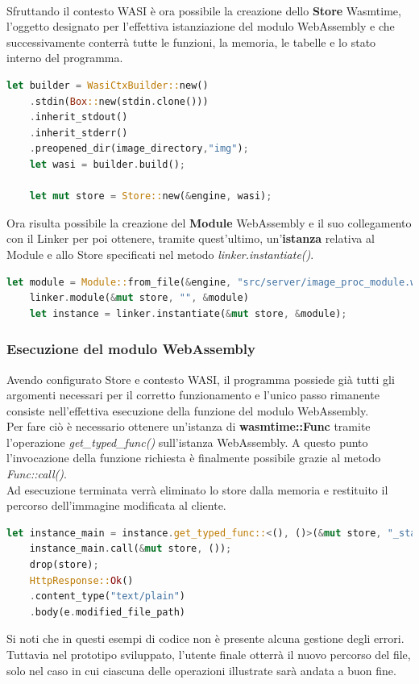 \\Sfruttando il contesto WASI è ora possibile la creazione dello \textbf{Store} Wasmtime, l'oggetto designato per l'effettiva istanziazione del modulo WebAssembly e che successivamente conterrà tutte le funzioni, la memoria, le tabelle e lo stato interno del programma.
\begin{lstlisting}[language=rust,caption={File handlers.rs: creazione di contesto WASI e Store}, showstringspaces=false]
    let builder = WasiCtxBuilder::new()
    .stdin(Box::new(stdin.clone()))
    .inherit_stdout()
    .inherit_stderr()
    .preopened_dir(image_directory,"img");
    let wasi = builder.build();
    
    let mut store = Store::new(&engine, wasi);
\end{lstlisting}
Ora risulta possibile la creazione del \textbf{Module} WebAssembly e il suo collegamento con il Linker per poi ottenere, tramite quest'ultimo, un'\textbf{istanza} relativa al Module e allo Store specificati nel metodo \emph{linker.instantiate()}.

\begin{lstlisting}[language=rust,caption={File handlers.rs: istanziazione modulo Wasm}, showstringspaces=false]
    let module = Module::from_file(&engine, "src/server/image_proc_module.wasm");
    linker.module(&mut store, "", &module) 
    let instance = linker.instantiate(&mut store, &module);
\end{lstlisting}
\subsubsection{Esecuzione del modulo WebAssembly}
Avendo configurato Store e contesto WASI, il programma possiede già tutti gli argomenti necessari per il corretto funzionamento e l'unico passo rimanente consiste nell'effettiva esecuzione della funzione del modulo WebAssembly.
\\Per fare ciò è  necessario ottenere un'istanza di \textbf{wasmtime::Func} tramite l'operazione \emph{get\_typed\_func()} sull'istanza WebAssembly.
A questo punto l'invocazione della funzione richiesta è finalmente possibile grazie al metodo \emph{Func::call()}.
\\Ad esecuzione terminata verrà eliminato lo store dalla memoria e restituito il percorso dell'immagine modificata al cliente.
\begin{lstlisting}[language=rust,caption={File handlers.rs: invocazione funzione \_start presente nel modulo Wasm}, showstringspaces=false]
    let instance_main = instance.get_typed_func::<(), ()>(&mut store, "_start");
    instance_main.call(&mut store, ());
    drop(store);
    HttpResponse::Ok()
    .content_type("text/plain")
    .body(e.modified_file_path)
\end{lstlisting}
Si noti che in questi esempi di codice non è presente alcuna gestione degli errori. Tuttavia nel prototipo sviluppato, l'utente finale otterrà il nuovo percorso del file, solo nel caso in cui ciascuna delle operazioni illustrate sarà andata a buon fine.
\newpage
